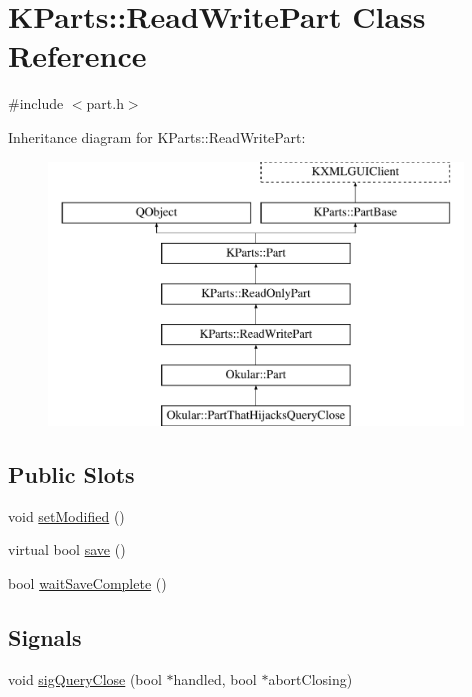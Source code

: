 \hypertarget{classKParts_1_1ReadWritePart}{\section{K\+Parts\+:\+:Read\+Write\+Part Class Reference}
\label{classKParts_1_1ReadWritePart}
}


{\ttfamily \#include $<$part.\+h$>$}

Inheritance diagram for K\+Parts\+:\+:Read\+Write\+Part\+:\begin{figure}[H]
\begin{center}
\leavevmode
\includegraphics[height=7.000000cm]{classKParts_1_1ReadWritePart}
\end{center}
\end{figure}
\subsection*{Public Slots}
\begin{DoxyCompactItemize}
\item 
void \hyperlink{classKParts_1_1ReadWritePart_a3d3c236bfa46585c595eb8fca1f8b50a}{set\+Modified} ()
\item 
virtual bool \hyperlink{classKParts_1_1ReadWritePart_afcd2d898594f129e47ac4505c2ae5cd0}{save} ()
\item 
bool \hyperlink{classKParts_1_1ReadWritePart_a3c27f7fb8ee9636e2c9d6b5cd6328e49}{wait\+Save\+Complete} ()
\end{DoxyCompactItemize}
\subsection*{Signals}
\begin{DoxyCompactItemize}
\item 
void \hyperlink{classKParts_1_1ReadWritePart_adb7caee3c74e13b22dd922f67a68f830}{sig\+Query\+Close} (bool $\ast$handled, bool $\ast$abort\+Closing)
\end{DoxyCompactItemize}
